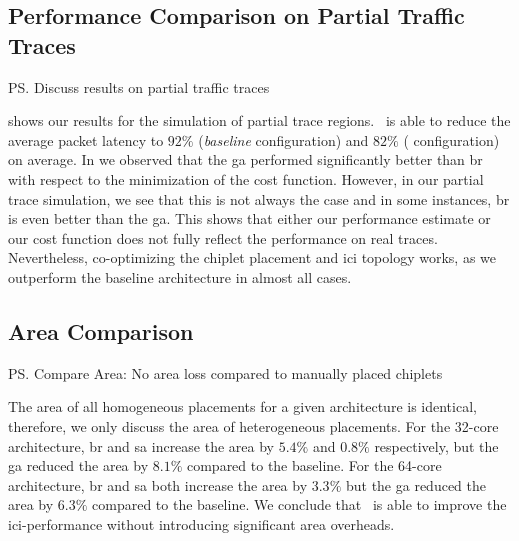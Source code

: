 \subsection{Performance Comparison on Partial Traffic Traces}
\label{ssec:eval-trace-partial}


\ps{Discuss results on partial traffic traces}

 shows our results for the simulation of partial trace regions.
\name~is able to reduce the average packet latency to $92\%$ (\textit{baseline} configuration) and $82\%$ (\textit{\name} configuration) on average.
In  we observed that the \gls{ga} performed significantly better than \gls{br} with respect to the minimization of the cost function.
However, in our partial trace simulation, we see that this is not always the case and in some instances, \gls{br} is even better than the \gls{ga}.
This shows that either our performance estimate or our cost function does not fully reflect the performance on real traces. 
Nevertheless, co-optimizing the chiplet placement and \gls{ici} topology works, as we outperform the baseline architecture in almost all cases.

\subsection{Area Comparison}
\label{ssec:eval-area}

\ps{Compare Area: No area loss compared to manually placed chiplets}

The area of all homogeneous placements for a given architecture is identical, therefore, we only discuss the area of heterogeneous placements. 
For the 32-core architecture, \gls{br} and \gls{sa} increase the area by $5.4\%$ and $0.8\%$ respectively, but the \gls{ga} reduced the area by $8.1\%$ compared to the baseline.
For the 64-core architecture, \gls{br} and \gls{sa} both increase the area by $3.3\%$ but the \gls{ga} reduced the area by $6.3\%$ compared to the baseline.
We conclude that \name~is able to improve the \gls{ici}-performance without introducing significant area overheads.











